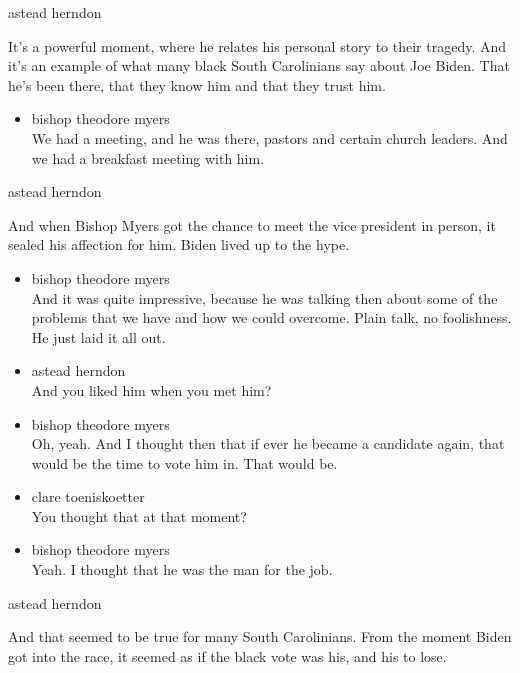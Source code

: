 astead herndon

It's a powerful moment, where he relates his personal story to their
tragedy. And it's an example of what many black South Carolinians say
about Joe Biden. That he's been there, that they know him and that they
trust him.

\begin{itemize}
\tightlist
\item
  bishop theodore myers\\
  We had a meeting, and he was there, pastors and certain church
  leaders. And we had a breakfast meeting with him.
\end{itemize}

astead herndon

And when Bishop Myers got the chance to meet the vice president in
person, it sealed his affection for him. Biden lived up to the hype.

\begin{itemize}
\item
  bishop theodore myers\\
  And it was quite impressive, because he was talking then about some of
  the problems that we have and how we could overcome. Plain talk, no
  foolishness. He just laid it all out.
\item
  astead herndon\\
  And you liked him when you met him?
\item
  bishop theodore myers\\
  Oh, yeah. And I thought then that if ever he became a candidate again,
  that would be the time to vote him in. That would be.
\item
  clare toeniskoetter\\
  You thought that at that moment?
\item
  bishop theodore myers\\
  Yeah. I thought that he was the man for the job.
\end{itemize}

astead herndon

And that seemed to be true for many South Carolinians. From the moment
Biden got into the race, it seemed as if the black vote was his, and his
to lose.

